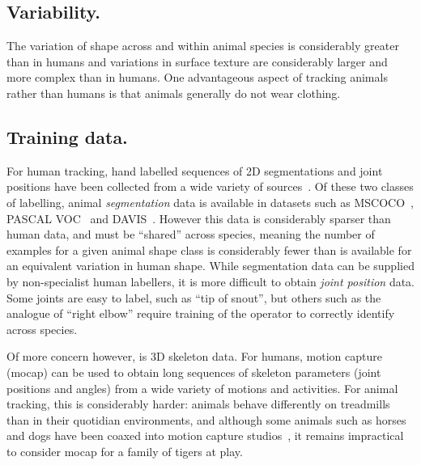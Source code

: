 \subsection{Variability.}
The variation of shape across and within animal species is considerably greater than in humans and variations in surface texture are considerably larger and more complex than in humans. One advantageous aspect of tracking animals rather than humans is that animals generally do not wear clothing. 


\subsection{Training data.}
For human tracking, hand labelled sequences of 2D segmentations and joint positions have been collected from a wide variety of sources~\cite{andriluka14cvpr,lin2014microsoft,johnson2010clustered}. Of these two classes of labelling, animal {\em segmentation} data is available in datasets such as MSCOCO~\cite{lin2014microsoft}, PASCAL VOC~\cite{everingham2010pascal} and DAVIS~\cite{Perazzi2016}.  However this data is considerably sparser than human data, and must be ``shared'' across species, meaning the number of examples for a given animal shape class is considerably fewer than is available for an equivalent variation in human shape.  While segmentation data can be supplied by non-specialist human labellers, it is more difficult to obtain {\em joint position} data.  Some joints are easy to label, such as ``tip of snout'', but others such as the analogue of ``right elbow'' require training of the operator to correctly identify across species.

Of more concern however, is 3D skeleton data.  For humans, motion capture (mocap) can be used to obtain long sequences of skeleton parameters (joint positions and angles) from a wide variety of motions and activities.
For animal tracking, this is considerably harder: animals behave differently on treadmills than in their quotidian environments, and although some animals such as horses and dogs have been coaxed into motion capture studios~\cite{wilhelm2015furyexplorer}, it remains impractical to consider mocap for a family of tigers at play.

